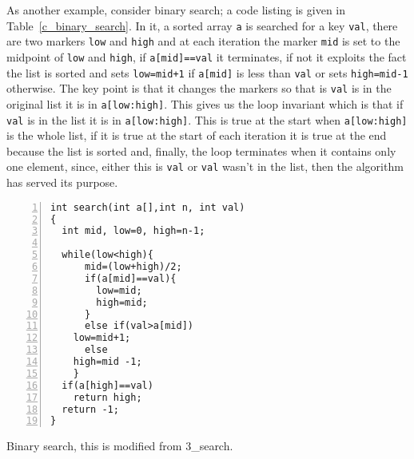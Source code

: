 \documentclass[11pt,a4paper]{scrartcl}
\begin{document}
As another example, consider binary search; a code listing is given in
Table~\ref{c_binary_search}. In it, a sorted array \texttt{a} is
searched for a key \texttt{val}, there are two markers \texttt{low}
and \texttt{high} and at each iteration the marker \texttt{mid} is set
to the midpoint of \texttt{low} and \texttt{high}, if
\texttt{a[mid]==val} it terminates, if not it exploits the fact the
list is sorted and sets \texttt{low=mid+1} if \texttt{a[mid]} is less
than \texttt{val} or sets \texttt{high=mid-1} otherwise. The key point
is that it changes the markers so that is \texttt{val} is in the
original list it is in \texttt{a[low:high]}. This gives us the loop
invariant which is that if \texttt{val} is in the list it is in
\texttt{a[low:high]}. This is true at the start when
\texttt{a[low:high]} is the whole list, if it is true at the start of
each iteration it is true at the end because the list is sorted and,
finally, the loop terminates when it contains only one element, since, either
this is \texttt{val} or \texttt{val} wasn't in the list, then
the algorithm has served its purpose.

\begin{table}
\begin{lstlisting}[numbers=left] 
int search(int a[],int n, int val)
{
  int mid, low=0, high=n-1;

  while(low<high){
      mid=(low+high)/2;
      if(a[mid]==val){
        low=mid;
        high=mid;
      }
      else if(val>a[mid])
	low=mid+1;
      else
	high=mid -1;
    }
  if(a[high]==val)
    return high;
  return -1;
}
\end{lstlisting}
\caption{Binary search, this is modified from 3\_search.\label{c_binary_search}}
\end{table}
\end{document}

